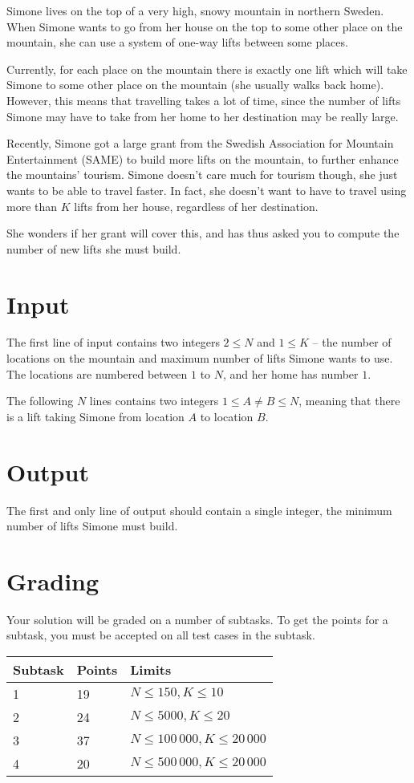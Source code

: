 
Simone lives on the top of a very high, snowy mountain in northern Sweden. When Simone wants to go from her house on the top
to some other place on the mountain, she can use a system of one-way lifts between some places.

Currently, for each place on the mountain there is exactly one lift which will take Simone to some other place on the
mountain (she usually walks back home). However, this means that travelling takes a lot of time, since the number
of lifts Simone may have to take from her home to her destination may be really large.

Recently, Simone got a large grant from the Swedish Association for Mountain Entertainment (SAME) to build more lifts on
the mountain, to further enhance the mountains' tourism. Simone doesn't care much for tourism though, she just wants
to be able to travel faster. In fact, she doesn't want to have to travel using more than $K$ lifts from her house,
regardless of her destination.

She wonders if her grant will cover this, and has thus asked you to compute the number of new lifts she must build.

\section*{Input}
The first line of input contains two integers $2 \le N$ and $1 \le K$ -- the number of locations on the mountain
and maximum number of lifts Simone wants to use. The locations are numbered between $1$ to $N$, and her home
has number $1$.

The following $N$ lines contains two integers $1 \le A \not= B \le N$, meaning that there is a lift taking
Simone from location $A$ to location $B$.

\section*{Output}
The first and only line of output should contain a single integer, the minimum number of lifts Simone
must build.

\section*{Grading}
Your solution will be graded on a number of subtasks. To get the points for a subtask, you must be accepted on all test cases in the subtask.

\begin{tabular}{|l|l|l|}
\hline
Subtask & Points & Limits \\ \hline
1 & 19 & $N \le 150, K \le 10$ \\ \hline
2 & 24 & $N \le 5000, K \le 20$ \\ \hline
3 & 37 & $N \le 100\,000, K \le 20\,000$ \\ \hline
4 & 20 & $N \le 500\,000, K \le 20\,000$ \\ \hline
\end{tabular}
